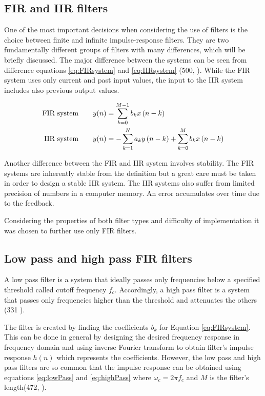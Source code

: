 \subsection{FIR and IIR filters}
\label{ssec:FIRandIIR}
One of the most important decisions when considering the use of filters is the choice between finite and infinite impulse-response filters. They are two fundamentally different groups of filters with many differences, which will be briefly discussed. The major difference between the systems can be seen from difference equations \ref{eq:FIRsystem} and \ref{eq:IIRsystem} (500, \cite{DSP3}). While the FIR system uses only current and past input values, the input to the IIR system includes also previous output values.

\begin{align}
	\text{FIR system\qquad} &y(n)= \sum\limits_{k=0}^{M-1}b_kx\,(n-k) \label{eq:FIRsystem}\\
	\text{IIR system\qquad} &y(n)= -\sum\limits_{k=1}^{N}a_ky\,(n-k) + \sum\limits_{k=0}^{M}b_kx\,(n-k) \label{eq:IIRsystem}
\end{align}

Another difference between the FIR and IIR system involves stability. The FIR systems are inherently stable from the definition but a great care must be taken in order to design a stable IIR system. The IIR systems also suffer from limited precision of numbers in a computer memory. An error accumulates over time due to the feedback. 

Considering the properties of both filter types and difficulty of implementation it was chosen to further use only FIR filters.

\subsection{Low pass and high pass FIR filters}
A low pass filter is a system that ideally passes only frequencies below a specified threshold called cutoff frequency $f_c$. Accordingly, a high pass filter is a system that passes only frequencies higher than the threshold and attenuates the others (331 \cite{DSP3}). 

The filter is created by finding the coefficients $b_k$ for Equation \ref{eq:FIRsystem}. This can be done in general by designing the desired frequency response in frequency domain and using inverse Fourier transform to obtain filter's impulse response $h(n)$ which represents the coefficients. However, the low pass and high pass filters are so common that the impulse response can be obtained using equations \ref{eq:lowPass} and \ref{eq:highPass} where $\omega_c = 2 \pi f_c$ and $M$ is the filter's length(472, \cite{DSP}).

